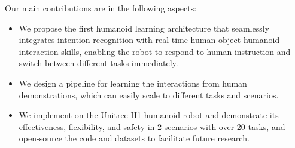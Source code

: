 Our main contributions are in the following aspects:
\begin{itemize}[leftmargin=*]
    \item We propose the first humanoid learning architecture that seamlessly integrates intention recognition with real-time human-object-humanoid interaction skills, enabling the robot to respond to human instruction and switch between different tasks immediately. 
    \item We design a pipeline for learning the interactions from human demonstrations, which can easily scale to different tasks and scenarios.
    \item We implement \our on the Unitree H1 humanoid robot and demonstrate its effectiveness, flexibility, and safety in 2 scenarios with over 20 tasks, and open-source the code and datasets to facilitate future research.
\end{itemize}
